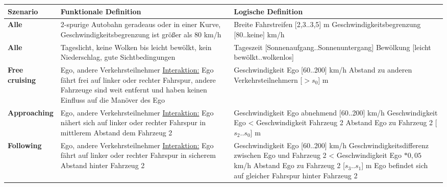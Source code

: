 \begin{longtable}[c]{p{2.5cm} p{5.5cm} p{5.5cm}}
\textbf{Szenario} & \textbf{Funktionale Definition} & \textbf{Logische Definition} \\
\hline
\endhead

\textbf{Alle} & 2-spurige Autobahn geradeaus oder in einer Kurve, Geschwindigkeitsbegrenzung ist größer als 80 km/h & Breite Fahrstreifen [2,3..3,5] m \newline Geschwindigkeitsbegrenzung [80..keine] km/h \\
\hline

\textbf{Alle} & Tageslicht, keine Wolken bis leicht bewölkt, kein Niederschlag, gute Sichtbedingungen & Tageszeit [Sonnenaufgang..Sonnenuntergang] \newline Bewölkung [leicht bewölkt..wolkenlos]\\
\hline \hline

\textbf{Free cruising} & Ego, andere Verkehrsteilnehmer \newline \underline{Interaktion:} Ego fährt frei auf linker oder rechter Fahrspur, andere Fahrzeuge sind weit entfernt und haben keinen Einfluss auf die Manöver des Ego & Geschwindigkeit Ego [60..200] km/h \newline Abstand zu anderen Verkehrsteilnehmern [$>s_0$] m \\
\hline

\textbf{Approaching} & Ego, andere Verkehrsteilnehmer \newline \underline{Interaktion:} Ego nähert sich auf linker oder rechter Fahrspur in mittlerem Abstand dem Fahrzeug 2 & Geschwindigkeit Ego abnehmend [60..200] km/h \newline Geschwindigkeit Ego < Geschwindigkeit Fahrzeug 2 \newline Abstand Ego zu Fahrzeug 2 [$s_2$..$s_0$] m \\
\hline

\textbf{Following} & Ego, andere Verkehrsteilnehmer \newline \underline{Interaktion:} Ego fährt auf linker oder rechter Fahrspur in sicherem Abstand hinter Fahrzeug 2 & Geschwindigkeit Ego [60..200] km/h \newline Geschwindigkeitsdifferenz zwischen Ego und Fahrzeug 2 < Geschwindigkeit Ego $*0,05$ km/h \newline Abstand Ego zu Fahrzeug 2 [$s_3$..$s_1$] m \newline Ego befindet sich auf gleicher Fahrspur hinter Fahrzeug 2 \\
\hline


\end{longtable}
